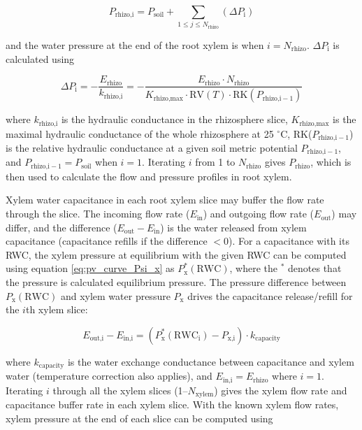 \documentclass[twoside,10pt]{report}
\begin{document}
\begin{equation}
    P_\text{rhizo,i} = P_\text{soil} + \sum_{1 \leq j \leq N_\text{rhizo}} \left( \Delta P_\text{i} \right)
\end{equation}

\par \noindent and the water pressure at the end of the root xylem is when $i = N_\text{rhizo}$. $\Delta P_\text{i}$ is calculated using

\begin{equation}
    \Delta P_\text{i} = 
        -\dfrac{E_\text{rhizo}}{k_\text{rhizo,i}} =
        -\dfrac{E_\text{rhizo} \cdot N_\text{rhizo}}
               {K_\text{rhizo,max} \cdot \text{RV}(T) \cdot \text{RK}(P_{\text{rhizo,i}-1})}
\end{equation}

\par \noindent where $k_\text{rhizo,i}$ is the hydraulic conductance in the rhizosphere slice, $K_\text{rhizo,max}$ is the maximal hydraulic conductance of the whole rhizosphere at 25 $^\circ$C, RK($P_{\text{rhizo,i}-1}$) is the relative hydraulic conductance at a given soil metric potential $P_{\text{rhizo,i}-1}$, and $P_{\text{rhizo,i}-1} = P_\text{soil}$ when $i = 1$. Iterating $i$ from 1 to $N_\text{rhizo}$ gives $P_\text{rhizo}$, which is then used to calculate the flow and pressure profiles in root xylem.

\par Xylem water capacitance in each root xylem slice may buffer the flow rate through the slice. The incoming flow rate ($E_\text{in}$) and outgoing flow rate ($E_\text{out}$) may differ, and the difference ($E_\text{out} - E_\text{in}$) is the water released from xylem capacitance (capacitance refills if the difference $< 0$). For a capacitance with its RWC, the xylem pressure at equilibrium with the given RWC can be computed using equation \ref{eq:pv_curve_Psi_x} as $P_\text{x}^{*}(\text{RWC})$, where the $^{*}$ denotes that the pressure is calculated equilibrium pressure. The pressure difference between $P_\text{x}(\text{RWC})$ and xylem water pressure $P_\text{x}$ drives the capacitance release/refill for the $i$th xylem slice:

\begin{equation}
    E_\text{out,i} - E_\text{in,i} = \left( P_\text{x}^{*}(\text{RWC}_\text{i}) - P_\text{x,i} \right) \cdot k_\text{capacity}
    \label{eq:flow_profile}
\end{equation}

\par \noindent where $k_\text{capacity}$ is the water exchange conductance between capacitance and xylem water (temperature correction also applies), and $E_\text{in,i} = E_\text{rhizo}$ where $i = 1$. Iterating $i$ through all the xylem slices (1--$N_\text{xylem}$) gives the xylem flow rate and capacitance buffer rate in each xylem slice. With the known xylem flow rates, xylem pressure at the end of each slice can be computed using
\end{document}
